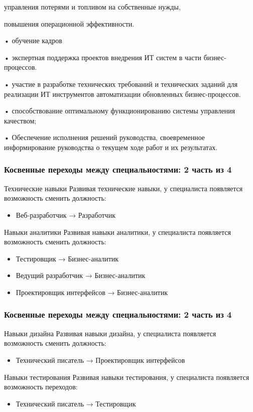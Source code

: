 \documentclass{../industrial-development}
\begin{document}
управления потерями и топливом на собственные нужды,

повышения операционной эффективности.

•       обучение кадров

•	экспертная поддержка проектов внедрения ИТ систем в части бизнес-процессов.

•	участие в разработке технических требований и технических заданий для реализации ИТ инструментов автоматизации обновленных бизнес-процессов.  

•	способствование оптимальному функционированию системы управления качеством;

•	Обеспечение исполнения решений руководства, своевременное информирование руководства о текущем ходе работ и их результатах.






\begin{frame} \frametitle{Косвенные переходы между специальностями: 2 часть из 4}
 \begin{block}{Технические навыки}
 Развивая \alert{технические навыки}, у специалиста появляется возможность сменить должность: 
\begin{itemize}
 \item Веб-разработчик → Разработчик
\end{itemize}
  \end{block}
  
\begin{block}{Навыки аналитики}
 Развивая \alert{навыки аналитики}, у специалиста появляется возможность сменить должность: 
\begin{itemize}
 \item Тестировщик → Бизнес-аналитик
 \item Ведущий разработчик → Бизнес-аналитик
 \item Проектировщик интерфейсов → Бизнес-аналитик
\end{itemize}
  \end{block}
\end{frame}


\begin{frame} \frametitle{Косвенные переходы между специальностями: 2 часть из 4}
 \begin{block}{Навыки дизайна}
 Развивая \alert{навыки дизайна}, у специалиста появляется возможность сменить должность: 
\begin{itemize}
 \item Технический писатель → Проектировщик интерфейсов
\end{itemize}
  \end{block}

\begin{block}{Навыки тестирования}
 Развивая \alert{навыки тестирования}, у специалиста появляется возможность переходов: 
\begin{itemize} 
 \item Технический писатель → Тестировщик
\end{itemize}
  \end{block}
\end{frame}
\end{document}
